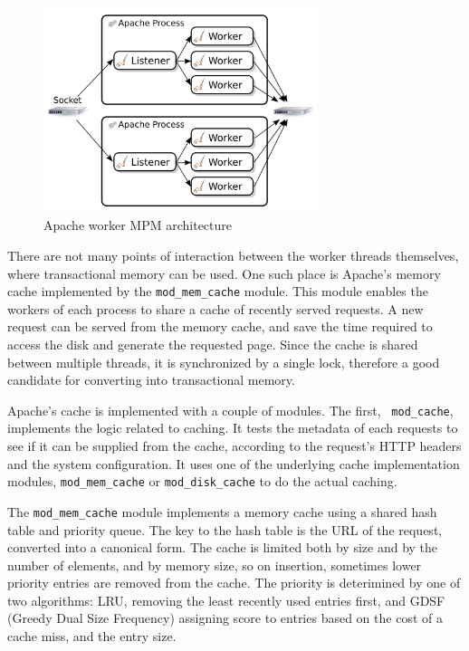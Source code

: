 \documentclass[preprint,natbib,11pt]{sigplanconf}
\begin{document}
\begin{figure}
 \begin{center}
  \includegraphics[width=8cm]{Apache-Worker-MPM.png}
 \end{center}
 \caption{Apache worker MPM architecture}
 \label{fig:apache-worker-MPM}
\end{figure}

There are not many points of interaction between the worker threads themselves,
where transactional memory can be used. One such place is Apache's memory cache
implemented by the {\tt mod\_mem\_cache}\cite{apache:mod_mem_cache} module. This
module enables the workers of each process to share a cache of recently served
requests. A new request can be served from the memory cache, and save the time
required to access the disk and generate the requested page. Since the cache is
shared between multiple threads, it is synchronized by a single lock, therefore
a good candidate for converting into transactional memory.

Apache's cache is implemented with a couple of modules. The first, {\tt
mod\_cache}\cite{apache:mod_cache}, implements the logic related to caching. It
tests the metadata of each requests to see if it can be supplied from the cache,
according to the request's HTTP headers and the system configuration. It uses
one of the underlying cache implementation modules, {\tt mod\_mem\_cache} or
{\tt mod\_disk\_cache}\cite{apache:mod_disk_cache} to do the actual caching.

The {\tt mod\_mem\_cache} module implements a memory cache using a shared hash
table and priority queue. The key to the hash table is the URL of the request,
converted into a canonical form. The cache is limited both by size and by the
number of elements, and by memory size, so on insertion, sometimes lower
priority entries are removed from the cache. The priority is deterimined by one
of two algorithms: LRU, removing the least recently used entries first, and GDSF
(Greedy Dual Size Frequency) assigning score to entries based on the cost of a
cache miss, and the entry size.
\end{document}
